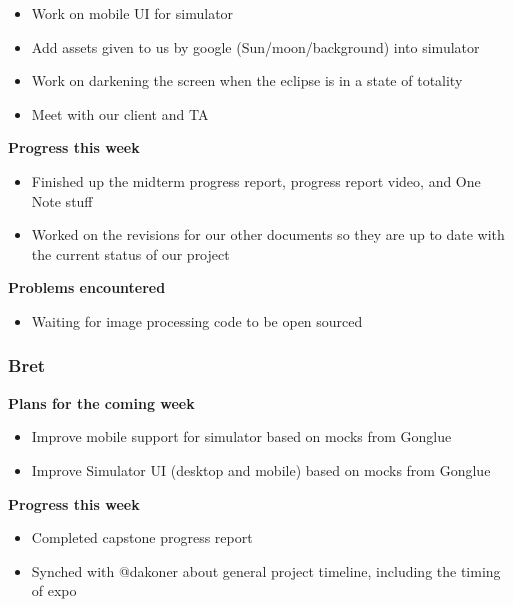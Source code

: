\documentclass[10pt, onecolumn, draftclsnofoot, letterpaper, compsoc]{IEEEtran}
\begin{document}
    \begin{itemize}

    \item Work on mobile UI for simulator
    \item Add assets given to us by google (Sun/moon/background) into simulator
    \item Work on darkening the screen when the eclipse is in a state of totality
    \item Meet with our client and TA

    \end{itemize}

    \noindent \textbf{Progress this week}

    \begin{itemize}

    \item Finished up the midterm progress report, progress report video, and One Note stuff
    \item Worked on the revisions for our other documents so they are up to date with the current status of our project

    \end{itemize}

    \noindent \textbf{Problems encountered}

    \begin{itemize}

    \item Waiting for image processing code to be open sourced

    \end{itemize}

    \subsubsection{Bret}

    \noindent \textbf{Plans for the coming week}

    \begin{itemize}

    \item Improve mobile support for simulator based on mocks from Gonglue
    \item Improve Simulator UI (desktop and mobile) based on mocks from Gonglue

    \end{itemize}

    \noindent \textbf{Progress this week}

    \begin{itemize}

    \item Completed capstone progress report
    \item Synched with @dakoner about general project timeline, including the timing of expo

    \end{itemize}
\end{document}
